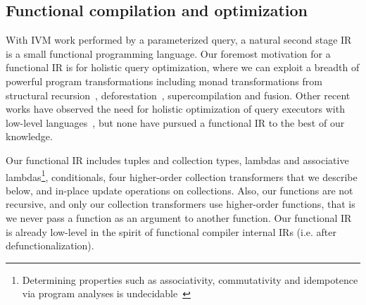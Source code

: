 \subsection{Functional compilation and optimization}
\label{sec:kthree}



\def\map{\mbox{\texttt{map}}}
\def\flatten{\mbox{\texttt{flatten}}}
\def\agg{\mbox{\texttt{agg}}}
\def\groupagg{\mbox{\texttt{groupagg}}}
\def\apply{\mbox{\texttt{apply}}}


With IVM work performed by a parameterized query, a natural second stage IR is a
small functional programming language.
Our foremost motivation for a functional IR is for holistic query optimization,
where we can exploit a breadth of powerful program transformations including
monad transformations from structural recursion~\cite{buneman-kleisli:95},
deforestation~\cite{marlow-fp:92}, supercompilation and fusion.
Other recent works have observed the need for holistic optimization of query
executors with low-level languages~\cite{krikellas-icde:10,neumann-pvldb:11},
but none have pursued a functional IR to the best of our knowledge.


Our functional IR includes tuples and collection types, lambdas and associative
lambdas\footnote{Determining properties such as associativity, commutativity and
idempotence via program analyses is undecidable~\cite{buneman-kleisli:95}},
conditionals, four higher-order collection transformers that we describe below,
and in-place update operations on collections.
Also, our functions are not recursive, and only our collection transformers use
higher-order functions, that is we never pass a function as an argument to
another function. Our functional IR is already low-level in the spirit of
functional compiler internal IRs (i.e. after defunctionalization).



